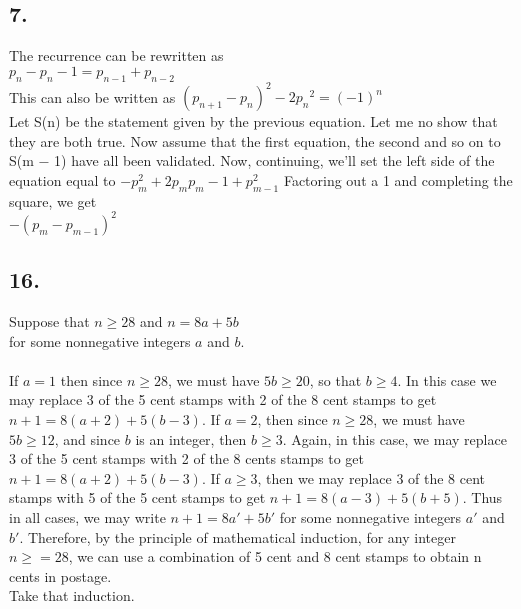 \documentclass[12]{scrartcl}
\begin{document}
\subsection*{7.}
The recurrence can be rewritten as\\
$p_n − p_n−1 = p_{n−1} + p_{n−2}$\\
This can also be written as
$(p_{n+1} − p_n)^2 − 2p_{n}{^2} = (−1)^n$\\
Let S(n) be the statement given by the previous equation. Let me no show that they are both true. Now assume that the first equation, the second and so on to S(m − 1) have all been validated. Now, continuing, we'll set the left side of the equation equal to 
$−p^2_m + 2p_m p_m −1 + p^2_{m−1}$ Factoring out a 1 and completing the square, we get\\
$-(p_m -p_{m-1})^2$
\subsection*{16.}
Suppose that $n ≥ 28$ and $n = 8a + 5b$\\
for some nonnegative integers $a$ and $b$. \\
\\ If $a = 1$ then since $n \geq 28$, we must have $5b  \geq 20$, so that $b  \geq 4$. In this case we may replace 3 of the 5 cent stamps with 2 of the 8 cent stamps to get $n+1 = 8(a+2)+5(b−3)$.
If $a = 2$, then since $n \geq 28$, we must have $5b \geq 12$, and since $b$ is an integer, then $b \geq 3$. Again, in this case, we may replace 3 of the 5 cent stamps with 2 of the 8 cents stamps to get $n+1 = 8(a+2)+5(b−3)$.
 If $a \geq 3$, then we may replace 3 of the 8 cent stamps with 5 of the 5 cent stamps to get $n+1 = 8(a−3)+5(b+5)$.
Thus in all cases, we may write $n + 1 = 8a′ + 5b′$ for some nonnegative integers $a′$ and$ b′$.
Therefore, by the principle of mathematical induction, for any integer $n \geq  = 28$, we can use a combination of 5 cent and 8 cent stamps to obtain n cents in postage.\\ Take that induction. 
\end{document}
